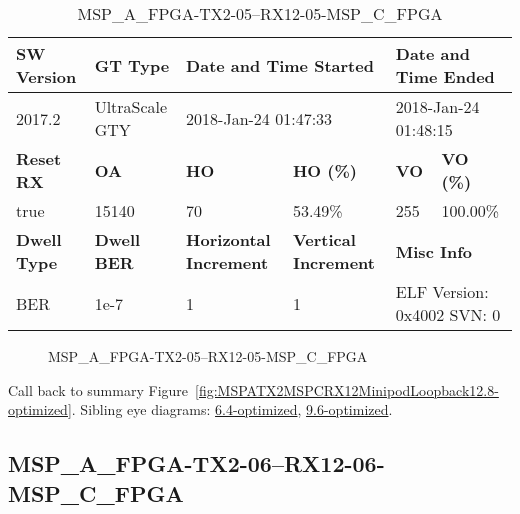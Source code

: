 \begin{table}[h]
\centering
\caption{MSP\_A\_FPGA-TX2-05--RX12-05-MSP\_C\_FPGA}
\label{tab:MSPAFPGATX205RX1205MSPCFPGA12.8-optimized}
\begin{tabular}{@{}|l|l|l|l|l|l|@{}}
\toprule
\textbf{SW Version}                & \textbf{GT Type}   & \multicolumn{2}{l|}{\textbf{Date and Time Started}}            & \multicolumn{2}{l|}{\textbf{Date and Time Ended}}        \\ \midrule
2017.2                       & UltraScale GTY          & \multicolumn{2}{l|}{2018-Jan-24 01:47:33}                   & \multicolumn{2}{l|}{2018-Jan-24 01:48:15}               \\ \midrule
\textbf{Reset RX}                  & \textbf{OA} & \textbf{HO}   & \textbf{HO (\%)} & \textbf{VO} & \textbf{VO (\%)} \\ \midrule
true & 15140        & 70          & 53.49\%        & 255        & 100.00\%       \\ \midrule
\textbf{Dwell Type}                & \textbf{Dwell BER} & \textbf{Horizontal Increment} & \textbf{Vertical Increment}    & \multicolumn{2}{l|}{\textbf{Misc Info}}                  \\ \midrule
BER                            & 1e-7        & 1        & 1           & \multicolumn{2}{l|}{ELF Version: 0x4002 SVN: 0}                         \\ \bottomrule
\end{tabular}
\end{table}

\begin{figure}[h]
\caption{MSP\_A\_FPGA-TX2-05--RX12-05-MSP\_C\_FPGA} \label{fig:MSPAFPGATX205RX1205MSPCFPGA12.8-optimized}
\end{figure}

Call back to summary Figure~\ref{fig:MSPATX2MSPCRX12MinipodLoopback12.8-optimized}.
Sibling eye diagrams: \hyperref[sec:MSPAFPGATX205RX1205MSPCFPGA6.4-optimized]{6.4-optimized}, \hyperref[sec:MSPAFPGATX205RX1205MSPCFPGA9.6-optimized]{9.6-optimized}.

\clearpage
\newpage


\subsection{MSP\_A\_FPGA-TX2-06--RX12-06-MSP\_C\_FPGA}\label{sec:MSPAFPGATX206RX1206MSPCFPGA12.8-optimized}

